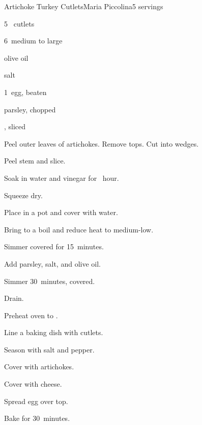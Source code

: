 \begin{recipe}{Artichoke Turkey Cutlets}{Maria Piccolina}{5 servings}

\begin{ingredients}
\item 5~ cutlets
\item 6~medium to large 
\item \Tp{2\half} olive oil
\item salt
\item 1~egg, beaten
\item parsley, chopped
\item {}, sliced
\end{ingredients}

\begin{directions}
\item Peel outer leaves of artichokes. Remove tops. Cut into wedges.
\item Peel stem and slice.
\item Soak in water and vinegar for \half~hour.
\item Squeeze dry.
\item Place in a pot and cover with water.
\item Bring to a boil and reduce heat to medium-low.
\item Simmer covered for 15~minutes.
\item Add parsley, salt, and olive oil.
\item Simmer 30~minutes, covered.
\item Drain.
\item Preheat oven to .
\item Line a baking dish with cutlets.
\item Season with salt and pepper.
\item Cover with artichokes.
\item Cover with cheese.
\item Spread egg over top.
\item Bake for 30~minutes.
\end{directions}

\hint{}
\end{recipe}
